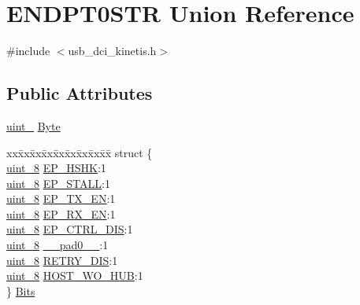 \hypertarget{union_e_n_d_p_t0_s_t_r}{}\section{E\+N\+D\+P\+T0\+S\+TR Union Reference}
\label{union_e_n_d_p_t0_s_t_r}


{\ttfamily \#include $<$usb\+\_\+dci\+\_\+kinetis.\+h$>$}

\subsection*{Public Attributes}
\begin{DoxyCompactItemize}
\item 
\hyperlink{types_8h_ad3209046c23f739a81581c10a4be7d92}{uint\+\_} \hyperlink{union_e_n_d_p_t0_s_t_r_a82be795788f6efb746682f7f023953b4}{Byte}
\item 
\begin{tabbing}
xx\=xx\=xx\=xx\=xx\=xx\=xx\=xx\=xx\=\kill
struct \{\\
\>\hyperlink{types_8h_ad3209046c23f739a81581c10a4be7d92}{uint\_8} \hyperlink{union_e_n_d_p_t0_s_t_r_ac5164e58504f88bf411f1642dbf7dc59}{EP\_HSHK}:1\\
\>\hyperlink{types_8h_ad3209046c23f739a81581c10a4be7d92}{uint\_8} \hyperlink{union_e_n_d_p_t0_s_t_r_a834ae07bbddb4be5843174c60066f02d}{EP\_STALL}:1\\
\>\hyperlink{types_8h_ad3209046c23f739a81581c10a4be7d92}{uint\_8} \hyperlink{union_e_n_d_p_t0_s_t_r_a2e44fd5cc1b454c0f3a43a4156c0929d}{EP\_TX\_EN}:1\\
\>\hyperlink{types_8h_ad3209046c23f739a81581c10a4be7d92}{uint\_8} \hyperlink{union_e_n_d_p_t0_s_t_r_a4ca0046b20afc6920982e7703880e499}{EP\_RX\_EN}:1\\
\>\hyperlink{types_8h_ad3209046c23f739a81581c10a4be7d92}{uint\_8} \hyperlink{union_e_n_d_p_t0_s_t_r_a8c37453ad6760f4f888d30aa2c6ee190}{EP\_CTRL\_DIS}:1\\
\>\hyperlink{types_8h_ad3209046c23f739a81581c10a4be7d92}{uint\_8} \hyperlink{union_e_n_d_p_t0_s_t_r_a8c95dcb61ebda1d9ea309ca104175879}{\_\_pad0\_\_}:1\\
\>\hyperlink{types_8h_ad3209046c23f739a81581c10a4be7d92}{uint\_8} \hyperlink{union_e_n_d_p_t0_s_t_r_a31bc8732c15885a90a5785d6811c6383}{RETRY\_DIS}:1\\
\>\hyperlink{types_8h_ad3209046c23f739a81581c10a4be7d92}{uint\_8} \hyperlink{union_e_n_d_p_t0_s_t_r_aa2689a805e34cf831ffa9932d8e35438}{HOST\_WO\_HUB}:1\\
\} \hyperlink{union_e_n_d_p_t0_s_t_r_af8d8a299854c30df91dd71a1de681133}{Bits}\\

\end{tabbing}\end{DoxyCompactItemize}


